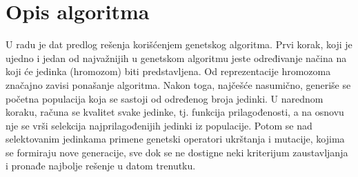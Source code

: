 \documentclass[12pt]{article}
\begin{document}
	\newpage
	\section{Opis algoritma}
	\label{sec:prvoPoglavlje}
	\par U radu je dat predlog rešenja korišćenjem genetskog algoritma. Prvi korak, koji je ujedno i jedan od najvažnijih u genetskom algoritmu jeste određivanje načina na koji 
	će jedinka (hromozom) biti predstavljena. Od reprezentacije hromozoma značajno zavisi ponašanje algoritma. Nakon toga, najčešće nasumično, generiše se početna populacija koja se sastoji od određenog broja jedinki. U narednom koraku, računa se kvalitet svake jedinke, tj. funkcija prilagođenosti, a na osnovu nje se vrši selekcija najprilagođenijih jedinki iz populacije. Potom se nad selektovanim jedinkama primene genetski operatori ukrštanja i mutacije, kojima se formiraju nove generacije, sve dok se ne dostigne neki kriterijum zaustavljanja i pronađe najbolje rešenje u datom trenutku.
	
\end{document}
